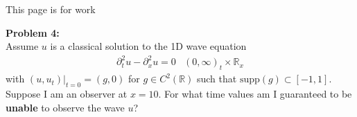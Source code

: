 \documentclass{article}
\newcommand{\R}{{\mathbb{R}}}
\newcommand{\pd}{\partial}
\begin{document}
\newpage

\vspace{0.5 cm}

\newpage

This page is for work
\newpage


\textbf{Problem 4:} \\


Assume $u$ is a classical solution to the 1D wave equation 
\begin{align*}
	\pd_{t}^{2}u - \pd_{x}^{2}u = 0 & (0,\infty)_{t} \times \R_{x}
\end{align*}
with $(u,u_t)|_{t=0} = (g,0)$ for $g \in C^{2}(\R)$ such that $\text{supp}(g) \subset [-1,1]$. Suppose I am an observer at $x=10$. For what time values am I guaranteed to be \textbf{unable} to observe the wave $u$? 
\end{document}
